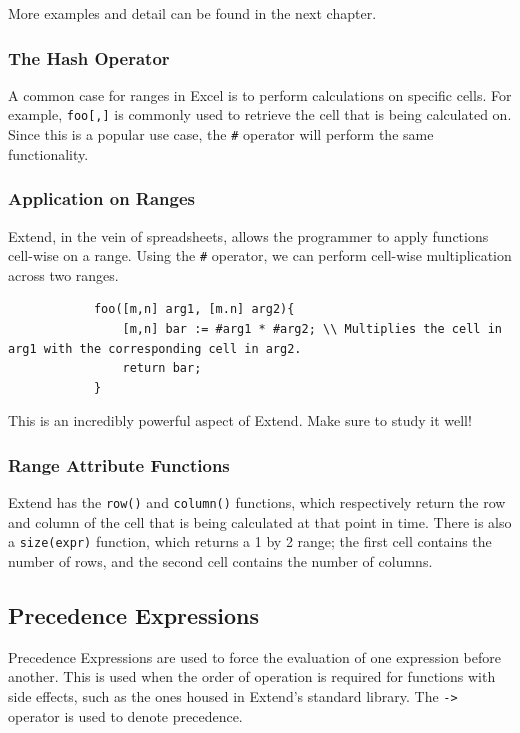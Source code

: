 		\medskip \noindent
		More examples and detail can be found in the next chapter.

		\subsubsection{The Hash Operator}
		A common case for ranges in Excel is to perform calculations on specific cells. For example, \texttt{foo[,]} is commonly used to retrieve the cell that is being calculated on.
		Since this is a popular use case, the \texttt{\#} operator will perform the same functionality.

		\subsubsection{Application on Ranges}
		Extend, in the vein of spreadsheets, allows the programmer to apply functions cell-wise on a range. Using the \texttt{\#} operator, we can perform cell-wise multiplication across two ranges.

		\begin{lstlisting}
			foo([m,n] arg1, [m.n] arg2){
				[m,n] bar := #arg1 * #arg2; \\ Multiplies the cell in arg1 with the corresponding cell in arg2.
				return bar;
			}
		\end{lstlisting}

		\medskip \noindent
		This is an incredibly powerful aspect of Extend. Make sure to study it well!

		\subsubsection{Range Attribute Functions}
		Extend has the \texttt{row()} and \texttt{column()} functions, which respectively return the row and column of the cell that is being calculated at that point in time.
		There is also a \texttt{size(expr)} function, which returns a 1 by 2 range; the first cell contains the number of rows, and the second cell contains the number of columns.

	\subsection{Precedence Expressions}
	Precedence Expressions are used to force the evaluation of one expression before another. This is used when the order of operation is required for functions with side effects, such as the ones housed in Extend's standard library.
	The \texttt{->} operator is used to denote precedence.

